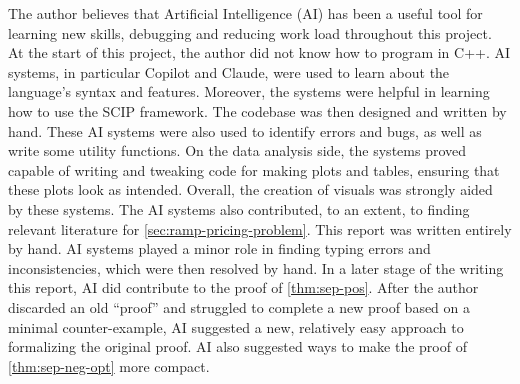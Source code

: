 The author believes that Artificial Intelligence (AI) has been a useful tool for learning new skills,
debugging and reducing work load throughout this project.
At the start of this project, the author did not know how to program in C++.
AI systems, in particular Copilot and Claude, were used to learn about the language's syntax and features.
Moreover, the systems were helpful in learning how to use the SCIP framework.
The codebase was then designed and written by hand.
These AI systems were also used to identify errors and bugs, as well as write some utility functions.
On the data analysis side, the systems proved capable of writing and tweaking code for making plots and tables,
ensuring that these plots look as intended.
Overall, the creation of visuals was strongly aided by these systems.
The AI systems also contributed, to an extent, to finding relevant literature for \autoref{sec:ramp-pricing-problem}.
This report was written entirely by hand.
AI systems played a minor role in finding typing errors and inconsistencies, which were then resolved by hand.
In a later stage of the writing this report, AI did contribute to the proof of \autoref{thm:sep-pos}.
After the author discarded an old ``proof'' and struggled to complete a new proof based on a minimal counter-example,
AI suggested a new, relatively easy approach to formalizing the original proof.
AI also suggested ways to make the proof of \autoref{thm:sep-neg-opt} more compact.